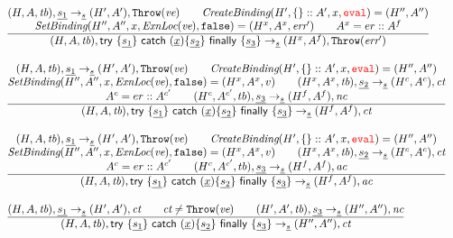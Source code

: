 \documentclass[a4paper, leqno]{amsart}
\newcommand{\rulesep}{\quad\quad}
\newcommand{\stmt}{s}
\newcommand{\ir}[1]{\ensuremath{\underline{#1}}}
\newcommand{\irid}{\ir{x}}
\def\inred{\color{red}}
\newcommand{\eval}{{\inred\tt eval}}
\newcommand{\false}{{\tt false}}
\newcommand{\tb}{\emph{tb}}
\newcommand{\err}{\emph{err}}
\newcommand{\ct}{\emph{ct}}
\newcommand{\ac}{\emph{ac}}
\newcommand{\nc}{\emph{nc}}
\newcommand{\hf}[1]{\emph{#1}}
\newcommand{\state}{\ensuremath{(H,A,\tb)}}
\newcommand{\statel}{\ensuremath{(H,A,\tb)}}
\newcommand{\statepl}{\ensuremath{(H',A',\tb)}}
\newcommand{\resp}{\ensuremath{(H',A')}}
\newcommand{\respp}{\ensuremath{(H'',A'')}}
\newcommand{\irtrycatfin}{\ensuremath{{\sf try} \ {\tt\{} \ir{\stmt_1} {\tt\}} \
{\sf catch} \ {\tt(}\irid{\tt)\{} \ir{\stmt_2} {\tt\}} \
{\sf finally} \ {\tt\{} \ir{\stmt_3} {\tt\}}}}
\def\inred{\color{red}}
\begin{document}
\[\begin{array}{l@{~~}l@{~~}ll}
\frac{\begin{matrix}
\statel, \ir{\stmt_1} \rightarrow_{\ir\stmt} \resp, {\tt Throw}(\emph{ve})
\rulesep
\hf{CreateBinding}(H',\{\}::A',x,\eval)=\respp
\\
\hf{SetBinding}(H'', A'', x, \hf{ExnLoc}(\emph{ve}), \false) = (H^x, A^x, \err')
\rulesep
A^x = er::A^f
\end{matrix}}{\begin{matrix}
\state, \irtrycatfin \rightarrow_{\ir\stmt} (H^x,A^f), {\tt Throw}(\err')
\end{matrix}}
\\[2em]

\frac{\begin{matrix}
\statel, \ir{\stmt_1} \rightarrow_{\ir\stmt} \resp, {\tt Throw}(\emph{ve})
\rulesep
\hf{CreateBinding}(H',\{\}::A',x,\eval)=\respp
\\
\hf{SetBinding}(H'', A'', x, \hf{ExnLoc}(\emph{ve}), \false) = (H^x, A^x, v)
\rulesep
(H^x,A^x,\tb), \ir{\stmt_2} \rightarrow_{\ir\stmt} (H^c,A^c), \ct
\\
A^c = er::A^{c'}
\rulesep
(H^c, A^{c'}, tb), \ir{\stmt_3} \rightarrow_{\ir\stmt} (H^f, A^f), \nc
\end{matrix}}{\begin{matrix}
\state, \irtrycatfin \rightarrow_{\ir\stmt} (H^f,A^f), \ct
\end{matrix}}
\\[2em]

\frac{\begin{matrix}
\statel, \ir{\stmt_1} \rightarrow_{\ir\stmt} \resp, {\tt Throw}(\emph{ve})
\rulesep
\hf{CreateBinding}(H',\{\}::A',x,\eval)=\respp
\\
\hf{SetBinding}(H'', A'', x, \hf{ExnLoc}(\emph{ve}), \false) = (H^x, A^x, v)
\rulesep
(H^x,A^x,\tb), \ir{\stmt_2} \rightarrow_{\ir\stmt} (H^c,A^c), \ct
\\
A^c = er::A^{c'}
\rulesep
(H^c, A^{c'}, tb), \ir{\stmt_3} \rightarrow_{\ir\stmt} (H^f, A^f), \ac
\end{matrix}}{\begin{matrix}
\state, \irtrycatfin \rightarrow_{\ir\stmt} (H^f,A^f), \ac
\end{matrix}}
\\[2em]

\frac{\begin{matrix}
\statel, \ir{\stmt_1} \rightarrow_{\ir\stmt} \resp, \ct
\rulesep
\ct \not= {\tt Throw}(\emph{ve})
\rulesep
\statepl, \ir{\stmt_3} \rightarrow_{\ir\stmt} \respp, \nc
\end{matrix}}{\begin{matrix}
\state, \irtrycatfin \rightarrow_{\ir\stmt} \respp, \ct
\end{matrix}}
\\[2em]


\end{array}\]
\end{document}
